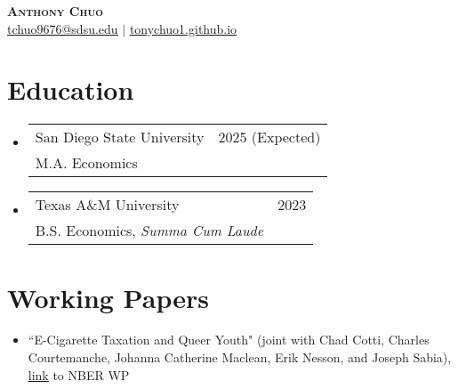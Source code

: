 \documentclass[letterpaper,11pt]{article}
\makeatletter
\newcommand{\resumeSubheading}[4]{
  \vspace{-2pt}
    \item
    \begin{tabular*}{0.97\textwidth}[t]{l@{\extracolsep{\fill}}r}
      #1 & #2 \\
      \hspace{0.15in}#3 & {#4} \\
    \end{tabular*}\vspace{-7pt}
}
\newcommand{\resumeSubHeadingListStart}{\begin{itemize}[leftmargin=0.15in, label={}]}
\newcommand{\resumeSubHeadingListEnd}{\end{itemize}}
\makeatother
\begin{document}


\begin{center}
    \textbf{\Huge \scshape Anthony Chuo} \\ \vspace{1pt}
    \href{mailto:tchuo9676@sdsu.edu}{\underline{tchuo9676@sdsu.edu}} $|$ 
    \href{https://github.com/tonychuo1}{\underline{tonychuo1.github.io}}
\end{center}


\section{Education}
  \resumeSubHeadingListStart
    \resumeSubheading
      {San Diego State University}{2025 (Expected)}
      {M.A. Economics}{}
    \resumeSubheading
      {Texas A\&M University}{2023}
      {B.S. Economics, \emph{Summa Cum Laude}}{}
  \resumeSubHeadingListEnd



\section{Working Papers}
  \resumeSubHeadingListStart

      \item ``E-Cigarette Taxation and Queer Youth" 
      (joint with Chad Cotti, Charles Courtemanche,
      Johanna Catherine Maclean, Erik Nesson, and 
      Joseph Sabia), \href{https://www.nber.org/papers/w33326}{\underline{link}} to NBER WP

  \resumeSubHeadingListEnd

%  
%
%
\end{document}
